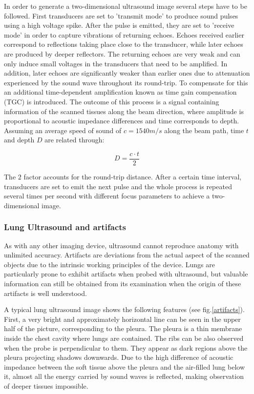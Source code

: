 \documentclass[12pt]{article} %
\begin{document}
	In order to generate a two-dimensional ultrasound image several steps have to be followed. First transducers are set to 'transmit mode' to produce sound pulses using a high voltage spike. After the pulse is emitted, they are set to 'receive mode' in order to capture vibrations of returning echoes. Echoes received earlier correspond to reflections taking place close to the transducer, while later echoes are produced by deeper reflectors.  The returning echoes are very weak and can only induce small voltages in the transducers that need to be amplified. In addition, later echoes are significantly weaker than earlier ones due to attenuation experienced by the sound wave throughout its round-trip. To compensate for this an additional time-dependent amplification known as time gain compensation (TGC) is introduced. The outcome of this process is a signal containing information of the scanned tissues along the beam direction, where amplitude is proportional to acoustic impedance differences and time corresponds to depth. Assuming an average speed of sound of $c = 1540 m/s$ along the beam path, time $t$ and depth $D$ are related through: 
	
\begin{equation}
D = \frac{c·t}{2} 
\end{equation}

The $2$ factor accounts for the round-trip distance. After a certain time interval, transducers are set to emit the next pulse and the whole process is repeated several times per second with different focus parameters to achieve a two-dimensional image. 

\subsubsection{Lung Ultrasound and artifacts}


	As with any other imaging device, ultrasound cannot reproduce anatomy with unlimited accuracy. Artifacts are deviations from the actual aspect of the scanned objects due to the intrinsic working principles of the device. Lungs are particularly prone to exhibit artifacts when probed with ultrasound, but valuable information can still be obtained from its examination when the origin of these artifacts is well understood. 
	
	A typical lung ultrasound image shows the following features (see fig.\ref{artifacts}). First, a very bright and approximately horizontal line can be seen in the upper half of the picture, corresponding to the pleura. The pleura is a thin membrane inside the chest cavity where lungs are contained. The ribs can be also observed when the probe is perpendicular to them. They appear as dark regions above the pleura projecting shadows downwards. Due to the high difference of acoustic impedance between the soft tissue above the pleura and the air-filled lung below it, almost all the energy carried by sound waves is reflected, making observation of deeper tissues impossible. 
	
\end{document}
